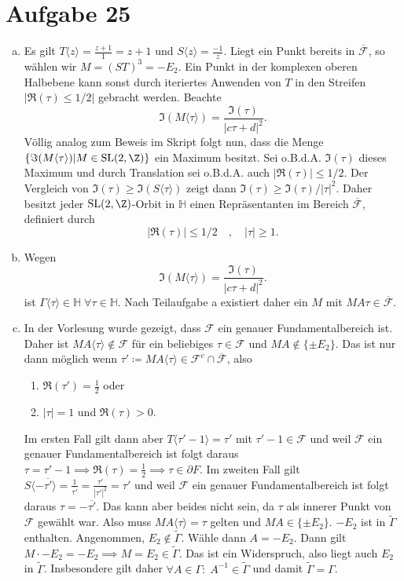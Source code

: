 \documentclass{article}
\begin{document}
  \section*{Aufgabe 25}
  \begin{enumerate}[(a)]
    \item Es gilt $T\langle z \rangle = \frac{z + 1}{1} = z+1$ und $S\langle z \rangle = \frac{-1}{z}$. Liegt ein Punkt bereits in $\overline{\mathcal{F}}$, so wählen wir $M = (ST)^3 = -E_2$.
    Ein Punkt in der komplexen oberen Halbebene kann sonst durch iteriertes Anwenden von $T$ in den Streifen $|\Re(\tau) \le 1/2|$ gebracht werden.
    Beachte
    \[
        \Im(M\langle \tau \rangle) = \frac{\Im(\tau)}{|c\tau + d|^2}.
    \]
    Völlig analog zum Beweis im Skript folgt nun, dass die Menge $\{\Im(M\langle \tau \rangle)|M\in \operatorname{SL}(2, \Z)\}$ ein Maximum besitzt. Sei o.B.d.A. $\Im(\tau)$ dieses Maximum und durch Translation sei o.B.d.A. auch $|\Re(\tau)| \leq 1/2$. Der Vergleich von $\Im(\tau) \geq \Im(S\langle \tau \rangle)$ zeigt dann $\Im(\tau) \geq \Im(\tau)/|\tau|^2$. Daher besitzt jeder $\operatorname{SL}(2,\Z)$-Orbit in $\mathbb{H}$ einen Repräsentanten im Bereich $\overline{\mathcal{F}}$, definiert durch
    \[
        |\Re(\tau)| \leq 1/2\quad, \quad |\tau| \geq 1.
    \]
    \item Wegen
    \[
        \Im(M\langle \tau \rangle) = \frac{\Im(\tau)}{|c\tau + d|^2}.
    \]
    ist $\Gamma\langle \tau \rangle \in \mathbb{H}\; \forall \tau \in \mathbb{H}$.
    Nach Teilaufgabe a existiert daher ein $M$ mit $M A \tau \in \overline{\mathcal{F}}$. 
    \item In der Vorlesung wurde gezeigt, dass $\mathcal{F}$ ein genauer Fundamentalbereich ist. Daher ist $MA\langle \tau \rangle \notin \mathcal{F}$ für ein beliebiges $\tau \in \mathcal{F}$ und $MA \notin \{\pm E_2\}$. Das ist nur dann möglich wenn $\tau' \coloneqq MA \langle \tau \rangle \in \mathcal{F}^c \cap \overline{\mathcal{F}}$, also
    \begin{enumerate}
      \item $\Re(\tau') = \frac{1}{2}$ oder
      \item $|\tau| = 1$ und $\Re(\tau) > 0$.
    \end{enumerate}
    Im ersten Fall gilt dann aber $T\langle \tau' - 1\rangle = \tau'$ mit $\tau' - 1 \in \mathcal{F}$ und weil $\mathcal{F}$ ein genauer Fundamentalbereich ist folgt daraus $\tau = \tau'-1 \implies \Re(\tau) = \frac{1}{2} \implies \tau \in \partial F$.
   Im zweiten Fall gilt $S\langle -\overline{\tau'} \rangle = \frac{1}{\overline{\tau'}} = \frac{\tau'}{|\tau'|^2} = \tau'$ und weil $\mathcal{F}$ ein genauer Fundamentalbereich ist folgt daraus $\tau = -\overline{\tau'}$. 
   Das kann aber beides nicht sein, da $\tau$ als innerer Punkt von $\mathcal{F}$ gewählt war. Also muss $MA\langle \tau \rangle = \tau$ gelten und $MA \in \{\pm E_2\}$.
   $- E_2$ ist in $\tilde \Gamma$ enthalten. Angenommen, $E_2 \notin \tilde \Gamma$. Wähle dann $A = - E_2$. Dann gilt $M \cdot -E_2 = -E_2 \implies M = E_2 \in \tilde \Gamma$. Das ist ein Widerspruch, also liegt auch $E_2$ in $\tilde \Gamma$. Insbesondere gilt daher $\forall A \in \Gamma\colon\; A^{-1} \in \tilde \Gamma$ und damit $\tilde \Gamma = \Gamma$.
  \end{enumerate}
\end{document}
